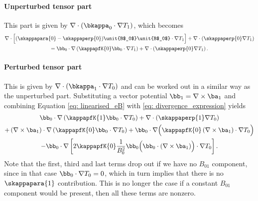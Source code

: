 \paragraph{Unperturbed tensor part} This part is given by $\nabla \cdot \left(\bkappa_0 \cdot \nabla T_1\right)$, which becomes
\begin{equation}
  \begin{gathered}
    \nabla \cdot \Bigl[(\skappapara{0} - \skappaperp{0})\unit{B$_0$}\unit{B$_0$} \cdot \nabla T_1\Bigr]
      + \nabla \cdot (\skappaperp{0}\nabla T_1) \\
    = \bb_0 \cdot \nabla \left(\kappapfK{0} \bb_0 \cdot \nabla T_1\right)
      + \nabla \cdot \left(\skappaperp{0}\nabla T_1\right).
  \end{gathered}
\end{equation}


\paragraph{Perturbed tensor part} This is given by $\nabla \cdot \left(\bkappa_1 \cdot \nabla T_0\right)$ and can be worked out in a similar way as the unperturbed part. Substituting a vector potential $\bb_1 = \nabla \times \ba_1$ and combining Equation \eqref{eq: linearised_eB} with \eqref{eq: divergence_expression} yields
\begin{equation}
  \begin{gathered}
    \bb_0 \cdot \nabla \left(\kappapfK{1}\bb_0 \cdot \nabla T_0\right)
    + \nabla \cdot \left(\skappaperp{1} \nabla T_0\right) \\
    + \left(\nabla \times \ba_1\right) \cdot \nabla \left(\kappapfK{0} \bb_0 \cdot \nabla T_0\right)
    + \bb_0 \cdot \nabla \Bigl(\kappapfK{0}\left(\nabla \times \ba_1\right) \cdot \nabla T_0\Bigr) \\
    - \bb_0 \cdot \nabla \left[
      2\kappapfK{0}\frac{1}{B_0^2}\bb_0 \Bigl(\bb_0 \cdot (\nabla \times \ba_1)\Bigr) \cdot \nabla T_0
    \right].
  \end{gathered}
\end{equation}
Note that the first, third and last terms drop out if we have no $B_{01}$ component, since in that case
$\bb_0 \cdot \nabla T_0 = 0$, which in turn implies that there is no $\skappapara{1}$ contribution.
This is no longer the case if a constant $B_{01}$ component would be present, then all these terms are nonzero.

